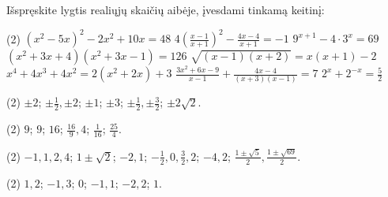 \documentclass[11pt,a4paper]{scrartcl}
\begin{document}
\begin{problem}
Išspręskite lygtis realiųjų skaičių aibėje, įvesdami tinkamą keitinį:
\begin{tasks}[label={(\arabic*)}, label-offset=0.9em](2)
    \task \((x^2-5x)^2-2x^2+10x=48\)
    \task \(4\left(\frac{x-1}{x+1}\right)^2-\frac{4x-4}{x+1}=-1\)
    \task \(9^{x+1}-4\cdot 3^x=69\)
    \task \((x^2+3x+4)(x^2+3x-1)=126\)
    \task \(\sqrt{(x-1)(x+2)}=x(x+1)-2\)
    \task \(x^4+4x^3+4x^2=2(x^2+2x)+3\)
    \task \(\frac{3x^2+6x-9}{x-1}+\frac{4x-4}{(x+3)(x-1)}=7\)
    \task \(2^x+2^{-x}=\frac{5}{2}\)
\end{tasks}
\end{problem}

\newpage
\answerssection

\begin{problem} \phantom{text}
\begin{tasks}[label={(\arabic*)}, label-offset=0.9em](2)
    \task \(\pm 2\);
    \task \(\pm \frac{1}{2}, \pm 2\);
    \task \(\pm 1\);
    \task \(\pm 3\);
    \task \(\pm \frac{1}{2}, \pm \frac{3}{2}\);
    \task \(\pm 2\sqrt{2}\).
\end{tasks}
\end{problem}

\begin{problem} \phantom{text}
\begin{tasks}[label={(\arabic*)}, label-offset=0.9em](2)
    \task $9$;
    \task $9$;
    \task $16$;
    \task \(\frac{16}{9}, 4\);
    \task \(\frac{1}{16}\);
    \task \(\frac{25}{4}\).
\end{tasks}
\end{problem}

\begin{problem} \phantom{text}
\begin{tasks}[label={(\arabic*)}, label-offset=0.9em](2)
    \task \(-1, 1, 2, 4\);
    \task \(1 \pm \sqrt{2}\);
    \task \(-2, 1\);
    \task \(-\frac{1}{2}, 0, \frac{3}{2}, 2\);
    \task \(-4, 2\);
    \task \(\frac{1 \pm \sqrt{5}}{2}, \frac{1 \pm \sqrt{69}}{2}\).
\end{tasks}
\end{problem}

\begin{problem} \phantom{text}
\begin{tasks}[label={(\arabic*)}, label-offset=0.9em](2)
    \task $1, 2$;
    \task \(-1, 3\);
    \task $0$;
    \task \(-1, 1\);
    \task \(-2, 2\);
    \task $1$.
\end{tasks}
\end{problem}
\end{document}
